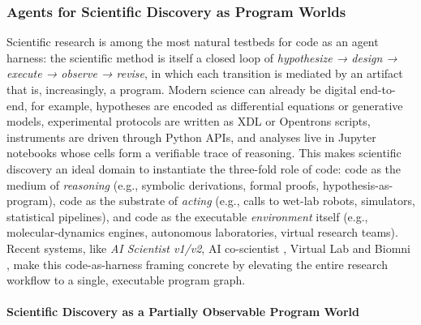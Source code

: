 \documentclass{llmxive}
\begin{document}
\subsubsection{Agents for Scientific Discovery as Program Worlds}

Scientific research is among the most natural testbeds for code as an agent harness: the scientific method is itself a closed loop of \textit{hypothesize → design → execute → observe → revise}, in which each transition is mediated by an artifact that is, increasingly, a program. Modern science can already be digital end-to-end, for example, hypotheses are encoded as differential equations or generative models, experimental protocols are written as XDL or Opentrons scripts, instruments are driven through Python APIs, and analyses live in Jupyter notebooks whose cells form a verifiable trace of reasoning. This makes scientific discovery an ideal domain to instantiate the three-fold role of code: code as the medium of \textit{reasoning} (e.g., symbolic derivations, formal proofs, hypothesis-as-program), code as the substrate of \textit{acting} (e.g., calls to wet-lab robots, simulators, statistical pipelines), and code as the executable \textit{environment} itself (e.g., molecular-dynamics engines, autonomous laboratories, virtual research teams). Recent systems, like \textit{AI Scientist v1/v2}, \citep{lu2024aiscientistfullyautomated,yamada2025aiscientistv2workshoplevelautomated} AI co-scientist \citep{gottweis2025aicoscientist}, Virtual Lab \citep{swanson2025virtual} and Biomni \citep{huang2025biomni}, make this code-as-harness framing concrete by elevating the entire research workflow to a single, executable program graph.

\paragraph{Scientific Discovery as a Partially Observable Program World}
\end{document}
